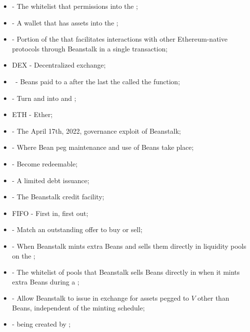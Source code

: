 \documentclass[class=article, crop=false]{standalone}
\begin{document}
\begin{itemize}[topsep=0pt, itemsep=3pt,leftmargin=16pt]
    \item[]  - \hypertarget{ht46}{The whitelist that permissions  into the };
    \item[]  - \hypertarget{ht47}{A wallet that has  assets into the };
    \item[]  - \hypertarget{ht48}{Portion of the  that facilitates interactions with other Ethereum-native protocols through Beanstalk in a single transaction};
    \item[] DEX - Decentralized exchange;
    \item[]  \Bean\ - \hypertarget{ht79}{Beans paid to a  after the last  the  called the  function};
    \item[]  - \hypertarget{ht80}{Turn  and  into  and };
    \item[] ETH - \hypertarget{ht81}{Ether};
    \item[]  - \hypertarget{ht82}{The April 17th, 2022, governance exploit of Beanstalk};
    \item[]  - \hypertarget{ht86}{Where Bean peg maintenance and use of Beans take place};
    \item[]  - \hypertarget{ht87}{Become redeemable};
    \item[]  - \hypertarget{ht88}{A limited debt issuance};
    \item[]  - \hypertarget{ht89}{The Beanstalk credit facility};
    \item[] FIFO - \hypertarget{ht89}{First in, first out};
    \item[]  - \hypertarget{ht90}{Match an outstanding offer to buy or sell};
    \item[]  - \hypertarget{ht91}{When Beanstalk mints extra Beans and sells them directly in liquidity pools on the };
    \item[]  - The whitelist of pools that Beanstalk sells Beans directly in when it mints extra Beans during a ;
    \item[]  - \hypertarget{ht93}{Allow Beanstalk to issue  in exchange for assets pegged to $V$ other than Beans, independent of the  minting schedule};
    \item[]  - \hypertarget{ht102}{ being created by };

\end{itemize}
\end{document}

